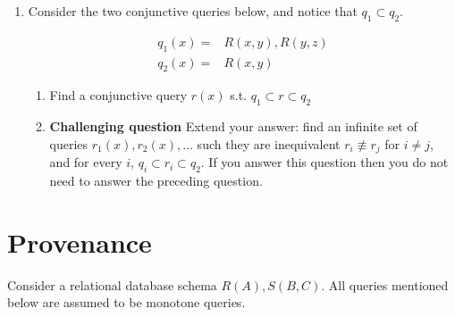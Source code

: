 \documentclass[12pt]{article}
\newcounter{query}
\begin{document}
\begin{enumerate}
\begin{enumerate}
  \end{enumerate}

\item Consider the two conjunctive queries below, and notice that $q_1
  \subset q_2$.

  \begin{align*}
    q_1(x) = & R(x,y), R(y,z) \\
    q_2(x) = & R(x,y)
  \end{align*}

  \begin{enumerate}
  \item Find a conjunctive query $r(x)$ s.t. $q_1 \subset r \subset
    q_2$
  \item {\bf Challenging question} Extend your answer: find an
    infinite set of queries $r_1(x), r_2(x), \ldots$ such they are
    inequivalent $r_i \not\equiv r_j$ for $i \neq j$, and for every
    $i$, $q_i \subset r_i \subset q_2$.  If you answer this question
    then you do not need to answer the preceding question.
  \end{enumerate}

\end{enumerate}

\section{Provenance}

Consider a relational database schema $R(A),S(B,C)$.  All queries
mentioned below are assumed to be monotone queries.
\end{document}
